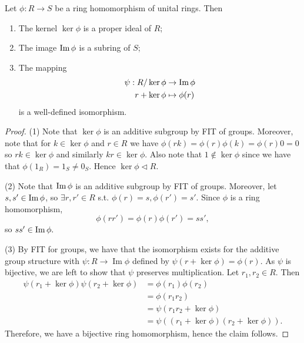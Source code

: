 \begin{theorem}
  Let $\phi:R\to S$ be a ring homomorphism of unital rings. Then
  \begin{enumerate}
    \item The kernel $\ker\phi$ is a proper ideal of $R$;
    \item The image $\operatorname{Im}\phi$ is a subring of $S$;
    \item The mapping 
    \begin{align*}
        \psi: R/\ker\phi &\to \operatorname{Im}\phi
        \\ r+\ker\phi&\mapsto \phi(r)
    \end{align*}
    is a well-defined isomorphism.
  \end{enumerate}
\end{theorem}
\begin{proof}
  (1) Note that $\ker\phi$ is an additive subgroup by FIT of groups. Moreover,
  note that for $k\in\ker\phi$ and $r\in R$ we have $\phi(rk)=\phi(r)\phi(k)=\phi(r)0=0$
  so $rk\in\ker\phi$ and similarly $kr\in\ker\phi$. Also note that $1\not\in\ker \phi$
  since we have that $\phi(1_R)=1_S\neq 0_S$. Hence $\ker\phi\lhd R$.

  (2) Note that $\operatorname{Im}\phi$ is an additive subgroup by FIT of groups. Moreover, let
  $s,s'\in\operatorname{Im}\phi$, so $\exists r,r' \in R$ s.t. $\phi(r) = s, \phi(r') = s'.$ Since $\phi$ is a ring homomorphism, 
  $$
  \phi(rr') = \phi(r)\phi(r') = ss',
  $$
  so $ss' \in \operatorname{Im}\phi.$
  
  
  

  (3) By FIT for groups, we have that the isomorphism exists for the
  additive group structure with $\psi:R\to \operatorname{Im} \phi$ defined by $\psi(r+\ker \phi)=\phi(r)$. As $\psi$ is bijective, we are left to show that $\psi$ preserves multiplication.
  Let $r_1,r_2 \in R.$ Then
\begin{align*}
    \psi(r_1+\ker\phi)\psi(r_2+\ker\phi)&=\phi(r_1)\phi(r_2)
    \\&=\phi(r_1 r_2)
    \\&=\psi(r_1 r_2+\ker\phi)
    \\&=\psi((r_1+\ker\phi)(r_2+\ker\phi)).
\end{align*}
Therefore, we have a bijective ring homomorphism, hence the claim follows.
\end{proof}

